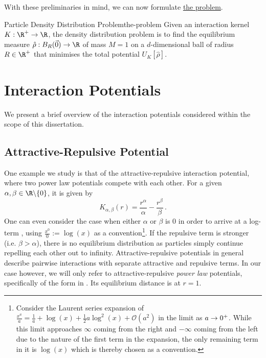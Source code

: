 With these preliminaries in mind, we can now formulate \href{def:the-problem}{the problem}.

\begin{definition}[colframe=gray, colbacktitle=gray!30]{Particle Density Distribution Problem}{the-problem}
  Given an interaction kernel $K: \R^+ \to \R$, the density distribution problem is to find the equilibrium measure $\hat{\rho}: B_R(\vec{0}) \to \R$ of mass $M = 1$ on a $d$-dimensional ball of radius $R \in \R^+$ that minimises the total potential $U_K[\hat{\rho}]$.
\end{definition}

\section{Interaction Potentials}
We present a brief overview of the interaction potentials considered within the scope of this dissertation.

\subsection{Attractive-Repulsive Potential}
One example we study is that of the attractive-repulsive interaction potential, where two power law potentials compete with each other.
For a given $\alpha, \beta \in \R \backslash \{0\}$, it is given by
\begin{equation}
  K_{\alpha, \beta}(r) = \frac{r^\alpha}{\alpha} - \frac{r^\beta}{\beta}\,.
  \label{eq:attractive-repulsive-potential}
\end{equation}
One can even consider the case when either $\alpha$ or $\beta$ is 0 in order to arrive at a log-term \parencite{2017-explicit-solutions}, using $\frac{x^0}{0} := \log(x)$ as a convention\footnote{
  Consider the Laurent series expansion of $\frac{x^a}{a} = \frac{1}{a} + \log(x) + \frac{1}{2}a \log^2(x) + \mathcal{O}(a^2)$ in the limit as $a \rightarrow 0^+$.
  While this limit approaches $\infty$ coming from the right and $-\infty$ coming from the left due to the nature of the first term in the expansion, the only remaining term in it is $\log(x)$ which is thereby chosen as a convention.
}.
If the repulsive term is stronger (i.e. $\beta > \alpha$), there is no equilibrium distribution as particles simply continue repelling each other out to infinity.
Attractive-repulsive potentials in general describe pairwise interactions with separate attractive and repulsive terms.
In our case however, we will only refer to attractive-repulsive \textit{power law} potentials, specifically of the form in .
Its equilibrium distance is at $r = 1$.

